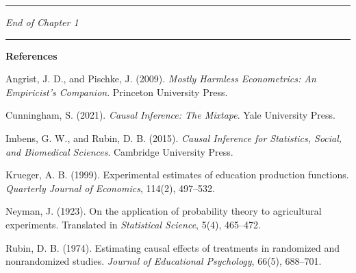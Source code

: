 \medskip\hrule\medskip

\textit{End of Chapter 1}

\medskip\hrule\medskip

\textbf{References}

Angrist, J. D., and Pischke, J. (2009). \textit{Mostly Harmless Econometrics: An Empiricist's Companion}. Princeton University Press.

Cunningham, S. (2021). \textit{Causal Inference: The Mixtape}. Yale University Press.

Imbens, G. W., and Rubin, D. B. (2015). \textit{Causal Inference for Statistics, Social, and Biomedical Sciences}. Cambridge University Press.

Krueger, A. B. (1999). Experimental estimates of education production functions. \textit{Quarterly Journal of Economics}, 114(2), 497--532.

Neyman, J. (1923). On the application of probability theory to agricultural experiments. Translated in \textit{Statistical Science}, 5(4), 465--472.

Rubin, D. B. (1974). Estimating causal effects of treatments in randomized and nonrandomized studies. \textit{Journal of Educational Psychology}, 66(5), 688--701.
